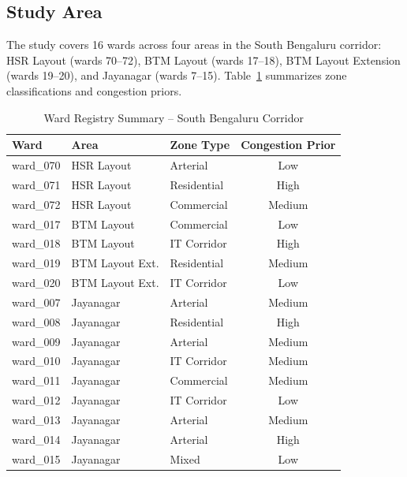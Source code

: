 \documentclass[conference]{IEEEtran}
\begin{document}
\subsection{Study Area}

The study covers 16 wards across four areas in the South Bengaluru corridor:
HSR Layout (wards 70--72), BTM Layout (wards 17--18), BTM Layout Extension
(wards 19--20), and Jayanagar (wards 7--15). Table~\ref{tab:wards} summarizes
zone classifications and congestion priors.

\begin{table}[!t]
\caption{Ward Registry Summary -- South Bengaluru Corridor}
\label{tab:wards}
\centering
\renewcommand{\arraystretch}{1.2}
\begin{tabular}{lllc}
\toprule
\textbf{Ward} & \textbf{Area} & \textbf{Zone Type} & \textbf{Congestion Prior} \\
\midrule
ward\_070 & HSR Layout      & Arterial       & Low    \\
ward\_071 & HSR Layout      & Residential    & High   \\
ward\_072 & HSR Layout      & Commercial     & Medium \\
ward\_017 & BTM Layout      & Commercial     & Low    \\
ward\_018 & BTM Layout      & IT Corridor    & High   \\
ward\_019 & BTM Layout Ext. & Residential    & Medium \\
ward\_020 & BTM Layout Ext. & IT Corridor    & Low    \\
ward\_007 & Jayanagar       & Arterial       & Medium \\
ward\_008 & Jayanagar       & Residential    & High   \\
ward\_009 & Jayanagar       & Arterial       & Medium \\
ward\_010 & Jayanagar       & IT Corridor    & Medium \\
ward\_011 & Jayanagar       & Commercial     & Medium \\
ward\_012 & Jayanagar       & IT Corridor    & Low    \\
ward\_013 & Jayanagar       & Arterial       & Medium \\
ward\_014 & Jayanagar       & Arterial       & High   \\
ward\_015 & Jayanagar       & Mixed          & Low    \\
\bottomrule
\end{tabular}
\end{table}
\end{document}
